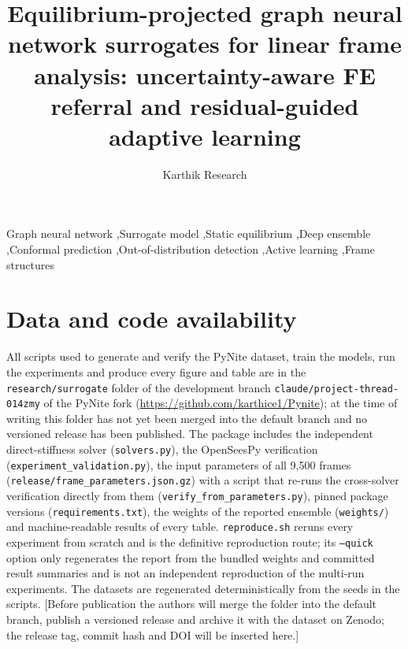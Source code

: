 \documentclass[preprint,12pt]{elsarticle}
\begin{document}
\begin{frontmatter}

\title{Equilibrium-projected graph neural network surrogates for linear frame analysis: uncertainty-aware FE referral and residual-guided adaptive learning}

\author[1]{Karthik Research}



\begin{keyword}
Graph neural network \sep Surrogate model \sep Static equilibrium \sep Deep ensemble \sep Conformal prediction \sep Out-of-distribution detection \sep Active learning \sep Frame structures
\end{keyword}

\end{frontmatter}







\section*{Data and code availability}
{\sloppy All scripts used to generate and verify the PyNite dataset, train the models, run the experiments and produce every figure and table are in the \texttt{research/surrogate} folder of the development branch \texttt{claude/project-thread-014zmy} of the PyNite fork (\url{https://github.com/karthice1/Pynite}); at the time of writing this folder has not yet been merged into the default branch and no versioned release has been published. The package includes the independent direct-stiffness solver (\texttt{solvers.py}), the OpenSeesPy verification (\texttt{experiment\_validation.py}), the input parameters of all 9{,}500 frames (\texttt{release/frame\_parameters.json.gz}) with a script that re-runs the cross-solver verification directly from them (\texttt{verify\_from\_parameters.py}), pinned package versions (\texttt{requirements.txt}), the weights of the reported ensemble (\texttt{weights/}) and machine-readable results of every table. \texttt{reproduce.sh} reruns every experiment from scratch and is the definitive reproduction route; its \texttt{--quick} option only regenerates the report from the bundled weights and committed result summaries and is not an independent reproduction of the multi-run experiments. The datasets are regenerated deterministically from the seeds in the scripts. [Before publication the authors will merge the folder into the default branch, publish a versioned release and archive it with the dataset on Zenodo; the release tag, commit hash and DOI will be inserted here.]\par}
\end{document}
